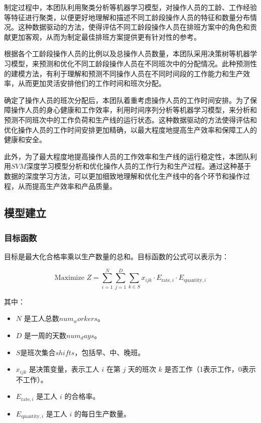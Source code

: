 \documentclass[withoutpreface,bwprint]{cumcmthesis}
\begin{document}
制定过程中，本团队利用聚类分析等机器学习模型，对操作人员的工龄、工作经验等特征进行聚类，以便更好地理解和描述不同工龄段操作人员的特征和数量分布情况。这种数据驱动的方法，使得评估不同工龄段操作人员在排班方案中的角色和贡献更加客观，从而为制定最佳排班方案提供更有针对性的参考。

根据各个工龄段操作人员的比例以及总操作人员数量，本团队采用决策树等机器学习模型，来预测和优化不同工龄段操作人员在不同班次中的分配情况。此种预测性的建模方法，有利于理解和预测不同操作人员在不同时间段的工作能力和生产效率，从而更加灵活安排他们的工作时间和班次分配。

确定了操作人员的班次分配后，本团队着重考虑操作人员的工作时间安排。为了保障操作人员的身心健康和工作效率，利用时间序列分析等机器学习模型，来分析和预测不同班次中的工作负荷和生产线的运行状态。这种数据驱动的方法使得评估和优化操作人员的工作时间安排更加精确，以最大程度地提高生产效率和保障工人的健康和安全。

此外，为了最大程度地提高操作人员的工作效率和生产线的运行稳定性，本团队利用\(SVM\)深度学习模型分析和优化操作人员的工作行为和生产过程。通过这种基于数据的深度学习方法，可以更加细致地理解和优化生产线中的各个环节和操作过程，从而提高生产效率和产品质量。


\subsection{模型建立}

\subsubsection{目标函数}

目标是最大化合格率乘以生产数量的总和。目标函数的公式可以表示为：

\[
\text{Maximize } Z = \sum_{i=1}^{N} \sum_{j=1}^{D} \sum_{k \in S} x_{ijk} \cdot E_{\text{rate},i} \cdot E_{\text{quantity},i}
\]

其中：

\begin{itemize}
    \item \( N \) 是工人总数\(num_workers\)。
    \item \( D \) 是一周的天数\(num_days\)。
    \item \(S\)是班次集合\(shifts\)，包括早、中、晚班。
    \item \( x_{ijk} \) 是决策变量，表示工人 \( i \) 在第 \( j \) 天的班次 \( k \) 是否工作（1表示工作，0表示不工作）。
    \item  \( E_{\text{rate},i} \) 是工人 \( i \) 的合格率。
    \item  \( E_{\text{quantity},i} \) 是工人 \( i \) 的每日生产数量。
    
\end{itemize}
\end{document}
